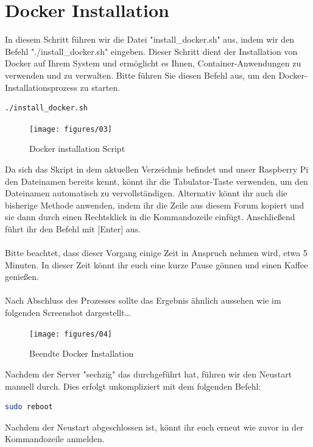 \documentclass[a4paper]{article}
\begin{document}
\section{Docker Installation}
In diesem Schritt führen wir die Datei "install\_docker.sh" aus, indem wir den Befehl "./install\_docker.sh" eingeben. Dieser Schritt dient der Installation von Docker auf Ihrem System und ermöglicht es Ihnen, Container-Anwendungen zu verwenden und zu verwalten. Bitte führen Sie diesen Befehl aus, um den Docker-Installationsprozess zu starten.
\begin{lstlisting}[language=bash, caption={Docker installation Script}, breaklines=false]
./install_docker.sh
\end{lstlisting}
\begin{figure}[htbp]
	\centering
	\texttt{[image: figures/03]}
	\caption{Docker installation Script}
	\label{fig:Docker installation Script}
\end{figure}
Da sich das Skript in dem aktuellen Verzeichnis befindet und unser Raspberry Pi den Dateinamen bereits kennt, könnt ihr die Tabulator-Taste verwenden, um den Dateinamen automatisch zu vervollständigen. Alternativ könnt ihr auch die bisherige Methode anwenden, indem ihr die Zeile aus diesem Forum kopiert und sie dann durch einen Rechtsklick in die Kommandozeile einfügt. Anschließend führt ihr den Befehl mit [Enter] aus.
\\\\
Bitte beachtet, dass dieser Vorgang einige Zeit in Anspruch nehmen wird, etwa 5 Minuten. In dieser Zeit könnt ihr euch eine kurze Pause gönnen und einen Kaffee genießen.
\\\\
Nach Abschluss des Prozesses sollte das Ergebnis ähnlich aussehen wie im folgenden Screenshot dargestellt…
\begin{figure}[htbp]
	\centering
	\texttt{[image: figures/04]}
	\caption{Beendte Docker Installation}
	\label{fig:beendte Docker Installation}
\end{figure}
Nachdem der Server "sechzig" das durchgeführt hat, führen wir den Neustart manuell durch. Dies erfolgt unkompliziert mit dem folgenden Befehl:

\begin{lstlisting}[language=bash, caption={Reboot Befehl}, breaklines=false]
	sudo reboot
\end{lstlisting}

Nachdem der Neustart abgeschlossen ist, könnt ihr euch erneut wie zuvor in der Kommandozeile anmelden.
\end{document}
